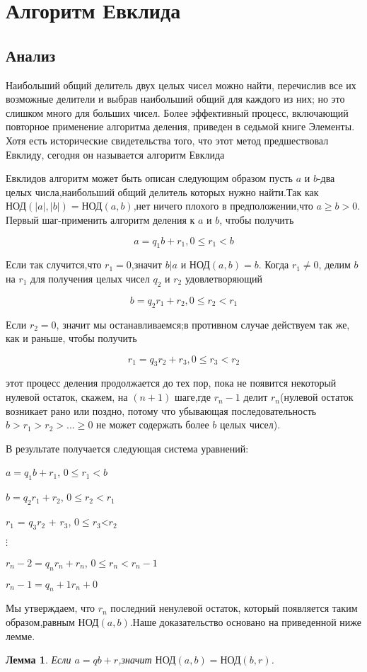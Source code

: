 \documentclass[11pt]{article}
\newtheorem{lemma}{Лемма}
\begin{document}
\section{Алгоритм Евклида}
\subsection{Анализ}
Наибольший общий делитель двух целых чисел можно найти, перечислив все их возможные делители и выбрав наибольший общий для каждого из них; но это слишком много для больших чисел. Более эффективный процесс, включающий повторное применение алгоритма деления, приведен в седьмой книге
Элементы.
Хотя есть исторические свидетельства того, что этот метод предшествовал Евклиду, сегодня он называется
алгоритм Евклида

 Евклидов алгоритм может быть описан следующим образом пусть $a$ и $b$-два целых числа,наибольший общий делитель которых нужно найти.Так как $\text{НОД}(|a|,|b|)=\text{НОД}(a,b)$,нет ничего плохого в предположении,что $a\ge b > 0$.
 Первый шаг-применить алгоритм деления к $a$ и $b$, чтобы получить
 
 	\[a=q_1b+r_1, 0\le r_1<b\]
 
 Если так случится,что $r_1=0$,значит $b|a$ и $\text{НОД}(a,b)=b$. Когда $r_1 \neq 0$,
 делим $b$ на $r_1$ для получения целых чисел $q_2$ и $r_2$ удовлетворяющий
 
 	\[b = q_2r_1 + r_2, 0\le r_2<r_1\]
 
 Если $r_2=0$, значит мы останавливаемся;в противном случае действуем так же, как и раньше, чтобы получить
 
 	\[r_1 = q_3r_2 + r_3, 0\le r_3<r_2\]
 
этот процесс деления продолжается до тех пор, пока не появится некоторый нулевой остаток, скажем, на $(n+1)$ шаге,где $r_n-1$ делит $r_n$(нулевой остаток возникает рано или поздно, потому что убывающая последовательность $b > r_1 > r_2 > ... \ge 0$ не может содержать более $b$ целых чисел).

В результате получается следующая система уравнений:
\begin{center}
	$a=q_1 b+r_1$,	$0\le r_1<b$
	
	$b = q_2r_1 + r_2$, $0\le r_2<r_1$
	
	$r_1$ = $q_3$$r_2$ + $r_3$, $0\le r_3$<$r_2$

    $\vdots$
    
    $r_n-2 = q_nr_n + r_n$, $0\le r_n<r_n-1$
    
    $r_n-1 = q_n+1r_n + 0$
\end{center}
Мы утверждаем, что $r_n$ последний ненулевой остаток, который появляется таким образом,равным $\text{НОД}(a,b)$.Наше доказательство основано на приведенной ниже лемме.
\begin{lemma}
	Если $a=qb+r$,значит $\text{НОД}(a,b)=\text{НОД}(b,r)$.
\end{lemma}
\nocite{Burton}


\end{document}
